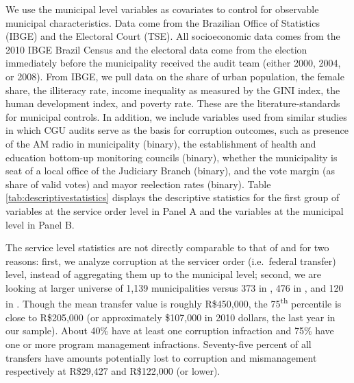 \documentclass[11pt]{article}
\begin{document}
We use the municipal level variables as covariates to control for observable municipal characteristics. Data come from the Brazilian Office of Statistics (IBGE) and the Electoral Court (TSE). All socioeconomic data comes from the 2010 IBGE Brazil Census and the electoral data come from the election immediately before the municipality received the audit team (either 2000, 2004, or 2008). From IBGE, we pull data on the share of urban population, the female share, the illiteracy rate, income inequality as measured by the GINI index, the human development index, and poverty rate. These are the literature-standards for municipal controls. In addition, we include variables used from similar studies in which CGU audits serve as the basis for corruption outcomes, such as presence of the AM radio in municipality (binary), the establishment of health and education bottom-up monitoring councils (binary), whether the municipality is seat of a local office of the Judiciary Branch (binary), and the vote margin (as share of valid votes) and mayor reelection rates (binary). Table \ref{tab:descriptivestatistics} displays the descriptive statistics for the first group of variables at the service order level in Panel A and the variables at the municipal level in Panel B.

The service level statistics are not directly comparable to that of \citet{FerrazExposingCorruptPoliticians2008b,FerrazElectoralAccountabilityCorruption2011a} and \citet{ZamboniAuditRiskRent2018} for two reasons: first, we analyze corruption at the servicer order (i.e.~federal transfer) level, instead of aggregating them up to the municipal level; second, we are looking at larger universe of 1,139 municipalities versus 373 in \citet{FerrazExposingCorruptPoliticians2008b}, 476 in \citet{FerrazElectoralAccountabilityCorruption2011a}, and 120 in \citet{ZamboniAuditRiskRent2018}. Though the mean transfer value is roughly R\$450,000, the 75\textsuperscript{th} percentile is close to R\$205,000 (or approximately \$107,000 in 2010 dollars, the last year in our sample). About 40\% have at least one corruption infraction and 75\% have one or more program management infractions. Seventy-five percent of all transfers have amounts potentially lost to corruption and mismanagement respectively at R\$29,427 and R\$122,000 (or lower).


\end{document}
